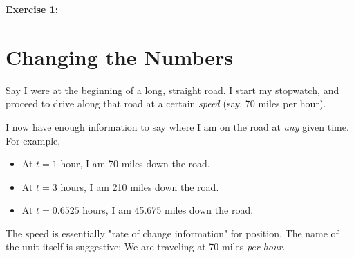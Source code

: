 \documentclass{article}
\begin{document}

\textbf{Exercise 1:} 



\section{Changing the Numbers}









Say I were at the beginning of a long, straight road. I start my stopwatch, and proceed to drive along that road at a certain \emph{speed} (say, 70 miles per hour). 

I now have enough information to say where I am on the road at \emph{any} given time. For example, 

\begin{itemize}
\item At $t = 1$ hour, I am 70 miles down the road.
\item At $t = 3$ hours, I am 210 miles down the road.
\item At $t = 0.6525$ hours, I am 45.675 miles down the road.
\end{itemize}

The speed is essentially "rate of change information" for position. The name of the unit itself is suggestive: We are traveling at 70 miles \emph{per hour}.




\end{document}
